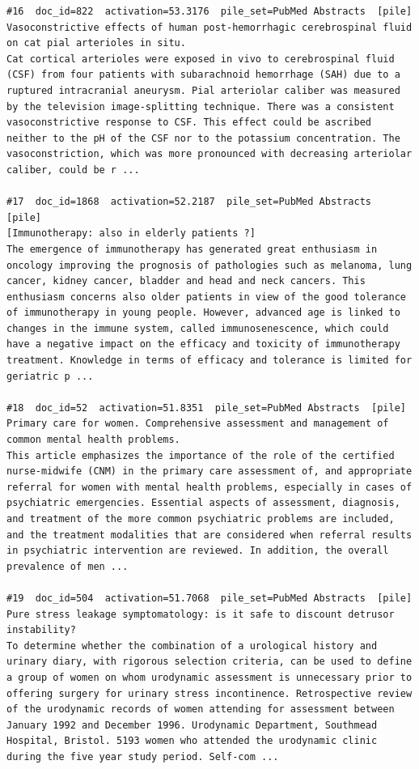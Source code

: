 \begin{verbatim}
#16  doc_id=822  activation=53.3176  pile_set=PubMed Abstracts  [pile]
Vasoconstrictive effects of human post-hemorrhagic cerebrospinal fluid on cat pial arterioles in situ.
Cat cortical arterioles were exposed in vivo to cerebrospinal fluid (CSF) from four patients with subarachnoid hemorrhage (SAH) due to a ruptured intracranial aneurysm. Pial arteriolar caliber was measured by the television image-splitting technique. There was a consistent vasoconstrictive response to CSF. This effect could be ascribed neither to the pH of the CSF nor to the potassium concentration. The vasoconstriction, which was more pronounced with decreasing arteriolar caliber, could be r ...

#17  doc_id=1868  activation=52.2187  pile_set=PubMed Abstracts  [pile]
[Immunotherapy: also in elderly patients ?]
The emergence of immunotherapy has generated great enthusiasm in oncology improving the prognosis of pathologies such as melanoma, lung cancer, kidney cancer, bladder and head and neck cancers. This enthusiasm concerns also older patients in view of the good tolerance of immunotherapy in young people. However, advanced age is linked to changes in the immune system, called immunosenescence, which could have a negative impact on the efficacy and toxicity of immunotherapy treatment. Knowledge in terms of efficacy and tolerance is limited for geriatric p ...

#18  doc_id=52  activation=51.8351  pile_set=PubMed Abstracts  [pile]
Primary care for women. Comprehensive assessment and management of common mental health problems.
This article emphasizes the importance of the role of the certified nurse-midwife (CNM) in the primary care assessment of, and appropriate referral for women with mental health problems, especially in cases of psychiatric emergencies. Essential aspects of assessment, diagnosis, and treatment of the more common psychiatric problems are included, and the treatment modalities that are considered when referral results in psychiatric intervention are reviewed. In addition, the overall prevalence of men ...

#19  doc_id=504  activation=51.7068  pile_set=PubMed Abstracts  [pile]
Pure stress leakage symptomatology: is it safe to discount detrusor instability?
To determine whether the combination of a urological history and urinary diary, with rigorous selection criteria, can be used to define a group of women on whom urodynamic assessment is unnecessary prior to offering surgery for urinary stress incontinence. Retrospective review of the urodynamic records of women attending for assessment between January 1992 and December 1996. Urodynamic Department, Southmead Hospital, Bristol. 5193 women who attended the urodynamic clinic during the five year study period. Self-com ...


\end{verbatim}
